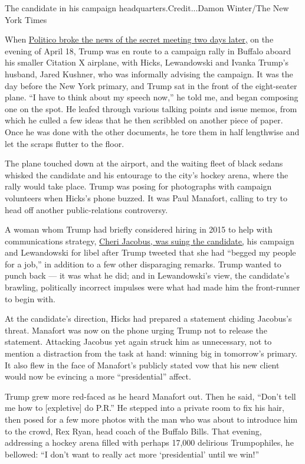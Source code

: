 The candidate in his campaign headquarters.Credit...Damon Winter/The New
York Times

When
\href{http://www.politico.com/story/2016/04/donald-trump-campaign-staff-222110}{Politico
broke the news of the secret meeting two days later,} on the evening of
April 18, Trump was en route to a campaign rally in Buffalo aboard his
smaller Citation X airplane, with Hicks, Lewandowski and Ivanka Trump's
husband, Jared Kushner, who was informally advising the campaign. It was
the day before the New York primary, and Trump sat in the front of the
eight-seater plane. ``I have to think about my speech now,'' he told me,
and began composing one on the spot. He leafed through various talking
points and issue memos, from which he culled a few ideas that he then
scribbled on another piece of paper. Once he was done with the other
documents, he tore them in half lengthwise and let the scraps flutter to
the floor.

The plane touched down at the airport, and the waiting fleet of black
sedans whisked the candidate and his entourage to the city's hockey
arena, where the rally would take place. Trump was posing for
photographs with campaign volunteers when Hicks's phone buzzed. It was
Paul Manafort, calling to try to head off another public-relations
controversy.

A woman whom Trump had briefly considered hiring in 2015 to help with
communications strategy,
\href{http://www.politico.com/blogs/2016-gop-primary-live-updates-and-results/2016/04/cheri-jacobus-trump-lewandowski-defamation-lawsuit-222103}{Cheri
Jacobus, was suing the candidate,} his campaign and Lewandowski for
libel after Trump tweeted that she had ``begged my people for a job,''
in addition to a few other disparaging remarks. Trump wanted to punch
back --- it was what he did; and in Lewandowski's view, the candidate's
brawling, politically incorrect impulses were what had made him the
front-runner to begin with.

At the candidate's direction, Hicks had prepared a statement chiding
Jacobus's threat. Manafort was now on the phone urging Trump not to
release the statement. Attacking Jacobus yet again struck him as
unnecessary, not to mention a distraction from the task at hand: winning
big in tomorrow's primary. It also flew in the face of Manafort's
publicly stated vow that his new client would now be evincing a more
``presidential'' affect.

Trump grew more red-faced as he heard Manafort out. Then he said,
``Don't tell me how to {[}expletive{]} do P.R.'' He stepped into a
private room to fix his hair, then posed for a few more photos with the
man who was about to introduce him to the crowd, Rex Ryan, head coach of
the Buffalo Bills. That evening, addressing a hockey arena filled with
perhaps 17,000 delirious Trumpophiles, he bellowed: ``I don't want to
really act more `presidential' until we win!''

